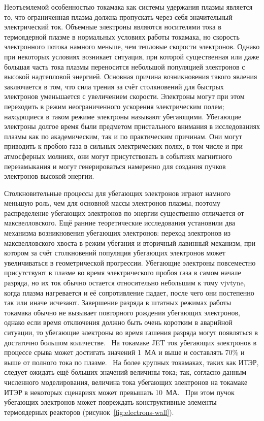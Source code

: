 
{\actuality}

Неотъемлемой особенностью токамака как системы удержания плазмы является то, что ограниченная плазма должна пропускать через себя значительный электрический ток. Объемные электроны являются носителями тока в термоядерной плазме в нормальных условиях работы токамака, но скорость электронного потока намного меньше, чем тепловые скорости электронов. Однако при некоторых условиях возникает ситуация, при которой существенная или даже большая часть тока плазмы переносится небольшой популяцией электронов с высокой надтепловой энергией. Основная причина возникновения такого явления заключается в том, что сила трения за счёт столкновений для быстрых электронов уменьшается с увеличением скорости. Электроны могут при этом переходить в режим неограниченного ускорения электрическим полем; находящиеся в таком режиме электроны называют убегающими. Убегающие электроны долгое время были предметом пристального внимания в исследованиях плазмы как по академическим, так и по практическим причинам. Они могут приводить к пробою газа в сильных электрических полях, в том числе и при атмосферных молниях, они могут присутствовать в событиях магнитного перезамыкания и могут генерироваться намеренно для создания пучков электронов высокой энергии.~\cite{Breizman2019}

Столкновительные процессы для убегающих электронов играют намного меньшую роль, чем для основной массы электронов плазмы, поэтому распределение убегающих электронов по энергии существенно отличается от максвелловского. Ещё ранние теоретические исследования установили два механизма возникновения убегающих электронов: переход электронов из максвелловского хвоста в режим убегания и вторичный лавинный механизм, при котором за счёт столкновений популяция убегающих электронов может увеличиваться в геометрической прогрессии. Убегающие электроны повсеместно присутствуют в плазме во время электрического пробоя газа в самом начале разряда, но их ток обычно остается относительно небольшим к тому vjvtyne, когда плазма нагревается и её сопротивление падает, после чего они постепенно так или иначе исчезают. Завершение разряда в штатных режимах работы токамака обычно не вызывает повторного рождения убегающих электронов, однако если время отключения должно быть очень коротким в аварийной ситуации, то убегающие электроны во время гашения разряда могут появляться в достаточно большом количестве.~\cite{Breizman2019} На токамаке JET ток убегающих электронов в процессе срыва может достигать значений 1~МА и выше и составлять 70\% и выше от полного тока по плазме.~\cite{Smith2006} 
На более крупных токамаках, таких как ИТЭР, следует ожидать ещё больших значений величины тока; так, согласно данным численного моделирования, величина тока убегающих электронов на токамаке ИТЭР в некоторых сценариях может превышать 10~МА.~\cite{Smith2006} При этом пучок убегающих электронов может повреждать конструктивные элементы термоядерных реакторов (рисунок~\ref{fig:electrons-wall}).~\cite{Bazylev2011}

